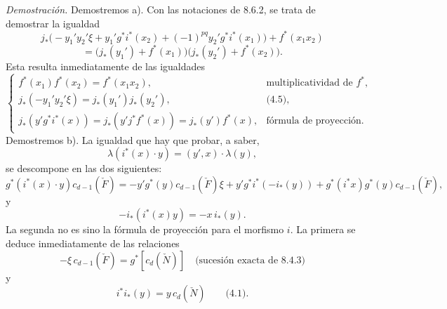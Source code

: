 \emph{Demostración.} Demostremos a). Con las notaciones de 8.6.2, se trata de demostrar la igualdad
\[
j_*\bigl(-y_1'y_2'\xi+y_1'g^*i^*(x_2)+(-1)^{pq}y_2'g^*i^*(x_1)\bigr)+f^*(x_1x_2)
\]
\[
=\bigl(j_*(y_1')+f^*(x_1)\bigr)\bigl(j_*(y_2')+f^*(x_2)\bigr).
\]
Esta resulta inmediatamente de las igualdades
\[
\begin{cases}
f^*(x_1)f^*(x_2)=f^*(x_1x_2),&\text{multiplicatividad de }f^*,\\
j_*(-y_1'y_2'\xi)=j_*(y_1')j_*(y_2'),&\text{(4.5)},\\
j_*(y'g^*i^*(x))=j_*(y'j^*f^*(x))=j_*(y')f^*(x),&\text{fórmula de proyección}.
\end{cases}
\]
Demostremos b). La igualdad que hay que probar, a saber,
\[
\lambda(i^*(x)\cdot y)=(y',x)\cdot\lambda(y),
\]
se descompone en las dos siguientes:
\[
g^*(i^*(x)\cdot y)c_{d-1}(\check F)
=
-y'g^*(y)c_{d-1}(\check F)\xi
+y'g^*i^*(-i_*(y))
+g^*(i^*x)g^*(y)c_{d-1}(\check F),
\]
y
\[
-i_*(i^*(x)y)=-x\,i_*(y).
\]
La segunda no es sino la fórmula de proyección para el morfismo $i$. La primera se deduce inmediatamente de las relaciones
\[
-\xi\,c_{d-1}(\check F)=g^*[c_d(\check N)]
\quad\text{(sucesión exacta de 8.4.3)}
\]
y
\[
i^*i_*(y)=y\,c_d(\check N)\qquad\text{(4.1)}.
\]
